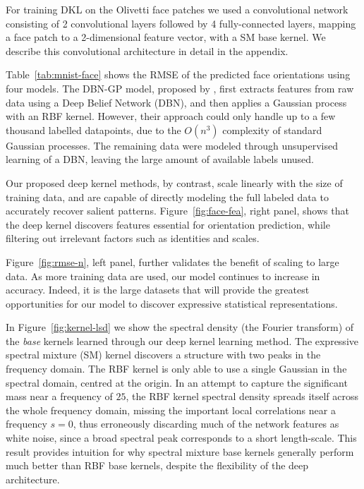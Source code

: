 \documentclass[twoside,11pt]{article}
\begin{document}
For training DKL on the Olivetti face patches we used a convolutional network consisting of 2 convolutional layers followed by 4 fully-connected layers, mapping a face patch to a 2-dimensional feature vector, with a SM base kernel.  We describe this convolutional architecture in detail in the appendix.

Table~\ref{tab:mnist-face} shows the RMSE of the predicted face orientations using four models.
The DBN-GP model, proposed by \cite{salakhutdinov2008}, first extracts features from raw data
using a Deep Belief Network (DBN), and then applies a Gaussian process with an RBF kernel.  However,
their approach could only handle up to a few thousand labelled datapoints, due to the $O(n^3)$ complexity of standard Gaussian processes.
The remaining data were modeled through unsupervised learning of a DBN, leaving the large amount of available labels unused.

Our proposed deep kernel methods, by contrast, scale linearly with the size of training data, and are capable of
directly modeling the full labeled data to accurately recover salient patterns. Figure~\ref{fig:face-fea}, right panel, shows that the deep kernel discovers features essential for orientation prediction, while filtering out irrelevant factors such as identities and scales.

Figure~\ref{fig:rmse-n}, left panel, further validates the benefit of scaling to large data. As more training data are used, our model continues to increase in accuracy. Indeed, it is the large datasets that will provide the greatest opportunities for our model to discover expressive statistical representations.

In Figure~\ref{fig:kernel-lsd} we show the spectral density (the Fourier transform) of the \emph{base} kernels learned through our deep kernel learning method. The expressive spectral mixture (SM) kernel discovers a structure with two peaks in the frequency domain.  The RBF kernel is only able to use a single Gaussian in the spectral domain, centred at the origin.  In an attempt to capture the significant mass near a frequency of $25$, the RBF kernel spectral density spreads itself across the whole frequency domain, missing the important local correlations near a frequency $s=0$, thus erroneously discarding much of the network features as white noise, since a broad spectral peak corresponds to a short length-scale.  This result provides intuition for why spectral mixture base kernels generally perform much better than RBF base kernels, despite the flexibility of the deep architecture.
\end{document}
